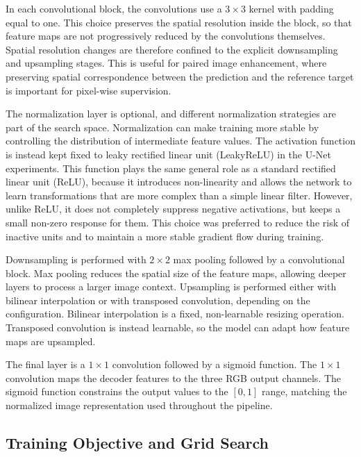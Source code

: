 In each convolutional block, the convolutions use a $3 \times 3$ kernel with padding equal to one. This choice preserves the spatial resolution inside the block, so that feature maps are not progressively reduced by the convolutions themselves. Spatial resolution changes are therefore confined to the explicit downsampling and upsampling stages. This is useful for paired image enhancement, where preserving spatial correspondence between the prediction and the reference target is important for pixel-wise supervision.

The normalization layer is optional, and different normalization strategies are part of the search space. Normalization can make training more stable by controlling the distribution of intermediate feature values. The activation function is instead kept fixed to leaky rectified linear unit (LeakyReLU) in the U-Net experiments. This function plays the same general role as a standard rectified linear unit (ReLU), because it introduces non-linearity and allows the network to learn transformations that are more complex than a simple linear filter. However, unlike ReLU, it does not completely suppress negative activations, but keeps a small non-zero response for them. This choice was preferred to reduce the risk of inactive units and to maintain a more stable gradient flow during training.

Downsampling is performed with $2 \times 2$ max pooling followed by a convolutional block. Max pooling reduces the spatial size of the feature maps, allowing deeper layers to process a larger image context. Upsampling is performed either with bilinear interpolation or with transposed convolution, depending on the configuration. Bilinear interpolation is a fixed, non-learnable resizing operation. Transposed convolution is instead learnable, so the model can adapt how feature maps are upsampled.

The final layer is a $1 \times 1$ convolution followed by a sigmoid function. The $1 \times 1$ convolution maps the decoder features to the three RGB output channels. The sigmoid function constrains the output values to the $[0,1]$ range, matching the normalized image representation used throughout the pipeline.

\subsection{Training Objective and Grid Search}

